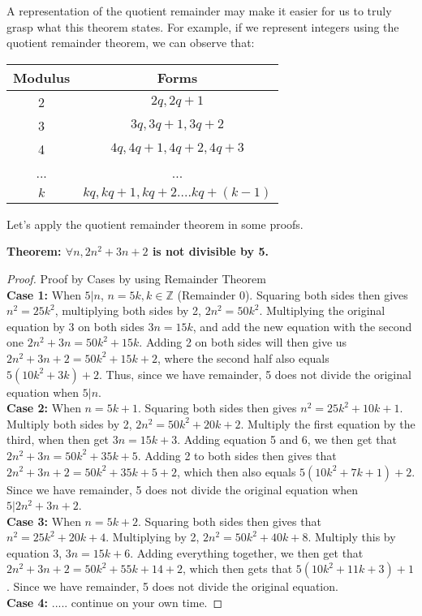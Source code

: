 A representation of the quotient remainder may make it easier for us to truly grasp what this theorem states. For example, if we represent integers using the quotient remainder theorem, we can observe that:

\begin{center}
\begin{tabular}{||c c ||} 
 \hline
 Modulus & Forms  \\ [0.5ex] 
 \hline\hline
 2 & $2q, 2q+1$  \\ 
 \hline
 3 & $3q, 3q+1, 3q+2$ \\
 \hline
 4 & $4q, 4q+1, 4q+2, 4q+3$  \\
 \hline
 ... & ...  \\
 \hline
 $k$ & $kq, kq+1, kq+2.... kq+(k-1)$  \\ [1ex] 
 \hline
\end{tabular}
\end{center}

Let's apply the quotient remainder theorem in some proofs.

\newpage
\begin{example}
    \textbf{Theorem: $\forall n, 2n^2+3n+2$ is not divisible by 5.}
\end{example}

\begin{proof}
    Proof by Cases by using Remainder Theorem\\
    \textbf{Case 1:} When $5|n$, $n=5k, k \in \mathbb{Z}$ (Remainder 0). Squaring both sides then gives $n^2=25k^2$, multiplying both sides by 2, $2n^2=50k^2$. Multiplying the original equation by 3 on both sides $3n=15k$, and add the new equation with the second one $2n^2+3n=50k^2+15k$. Adding 2 on both sides will then give us $2n^2+3n+2=50k^2+15k+2$, where the second half also equals $5(10k^2+3k)+2$. Thus, since we have remainder, 5 does not divide the original equation when $5|n$.\\
    \textbf{Case 2:} When $n=5k+1$. Squaring both sides then gives $n^2=25k^2+10k+1$. Multiply both sides by 2, $2n^2=50k^2+20k+2$. Multiply the first equation by the third, when then get $3n=15k+3.$ Adding equation 5 and 6, we then get that $2n^2+3n=50k^2+35k+5$. Adding 2 to both sides then gives that $2n^2+3n+2=50k^2+35k+5+2$, which then also equals $5(10k^2+7k+1)+2$. Since we have remainder, 5 does not divide the original equation when $5|2n^2+3n+2$.\\
    \textbf{Case 3:} When $n=5k+2$. Squaring both sides then gives that $n^2=25k^2+20k+4$. Multiplying by 2, $2n^2=50k^2+40k+8$. Multiply this by equation 3, $3n=15k+6$. Adding everything together, we then get that $2n^2+3n+2=50k^2+55k+14+2$, which then gets that $5(10k^2+11k+3)+1$. Since we have remainder, 5 does not divide the original equation.\\
    \textbf{Case 4:} ..... continue on your own time.
\end{proof}

